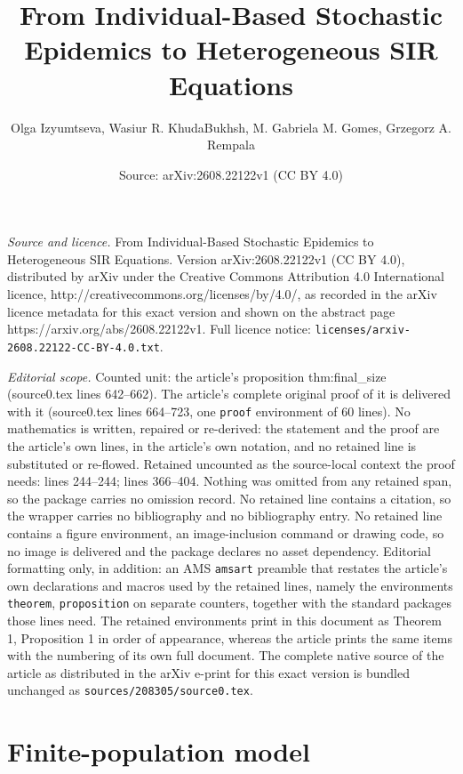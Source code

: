 \documentclass[10pt,a4paper]{amsart}
\title{From Individual-Based Stochastic Epidemics to Heterogeneous SIR Equations}
\author{Olga Izyumtseva, Wasiur R. KhudaBukhsh, M. Gabriela M. Gomes, Grzegorz A. Rempala}
\date{Source: arXiv:2608.22122v1 (CC BY 4.0)}
\begin{document}
\maketitle

\noindent\emph{Source and licence.} From Individual-Based Stochastic Epidemics to Heterogeneous SIR Equations. Version arXiv:2608.22122v1 (CC BY 4.0), distributed by arXiv under the Creative Commons Attribution 4.0 International licence, http://creativecommons.org/licenses/by/4.0/, as recorded in the arXiv licence metadata for this exact version and shown on the abstract page https://arxiv.org/abs/2608.22122v1. Full licence notice: \texttt{licenses/arxiv-2608.22122-CC-BY-4.0.txt}.\par\smallskip

\noindent\textit{Editorial scope.} Counted unit: the article's proposition thm:final\_size (source0.tex lines 642--662). The article's complete original proof of it is delivered with it (source0.tex lines 664--723, one \texttt{proof} environment of 60 lines). No mathematics is written, repaired or re-derived: the statement and the proof are the article's own lines, in the article's own notation, and no retained line is substituted or re-flowed.  Retained uncounted as the source-local context the proof needs: lines 244--244; lines 366--404.  Nothing was omitted from any retained span, so the package carries no omission record.  No retained line contains a citation, so the wrapper carries no bibliography and no bibliography entry.  No retained line contains a figure environment, an image-inclusion command or drawing code, so no image is delivered and the package declares no asset dependency.  Editorial formatting only, in addition: an AMS \texttt{amsart} preamble that restates the article's own declarations and macros used by the retained lines, namely the environments \texttt{theorem}, \texttt{proposition} on separate counters, together with the standard packages those lines need.  The retained environments print in this document as Theorem 1, Proposition 1 in order of appearance, whereas the article prints the same items with the numbering of its own full document.  The complete native source of the article as distributed in the arXiv e-print for this exact version is bundled unchanged as \texttt{sources/208305/source0.tex}.
\section{Finite-population model}\label{sec:model}
\end{document}
